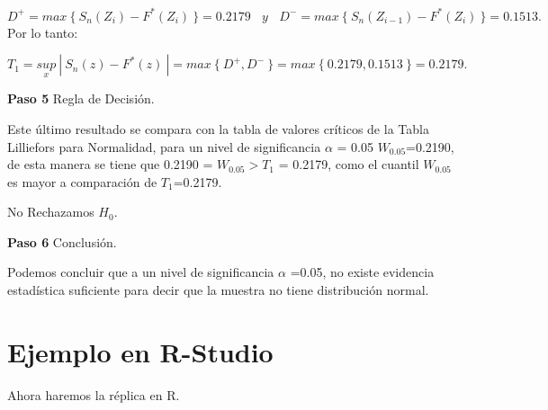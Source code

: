 \documentclass[
  a4paper,
  oneside,
  openany]{book}
\begin{document}
\[ D^+= max\ \{\ S_{n}(Z_{i})-F^*(Z_{i}) \ \}= 0.2179 \ \ \ \ y\ \ \ \ D^-= max\ \{ \ S_{n}(Z_{i-1})-F^*(Z_{i}) \ \}=0.1513. \]
Por lo tanto:

\[T_{1}=\underset{x}{sup}\ | \ S_{n}(z)-F^*(z) \ |=max \ \{\ D^+,D^- \ \}=max \ \{ \  0.2179,0.1513 \ \}=0.2179. \]

\textbf{Paso 5} Regla de Decisión.

Este último resultado se compara con la tabla de valores críticos de la Tabla Lilliefors para Normalidad, para un nivel de significancia \(\alpha\) = 0.05 \(W_{0.05}\)=0.2190, de esta manera se tiene que 0.2190 = \(W_{0.05} > T_{1}\) = 0.2179, como el cuantil \(W_{0.05}\) es mayor a comparación de \(T_{1}\)=0.2179.

No Rechazamos \(H_0\).

\textbf{Paso 6} Conclusión.

Podemos concluir que a un nivel de significancia \(\alpha\) =0.05, no existe evidencia estadística suficiente para decir que la muestra no tiene distribución normal.

\hypertarget{ejemplo-en-r-studio-15}{%
\section{Ejemplo en R-Studio}\label{ejemplo-en-r-studio-15}}

Ahora haremos la réplica en R.
\end{document}
